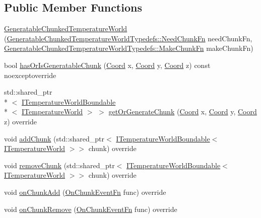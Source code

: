 \subsection*{Public Member Functions}
\begin{DoxyCompactItemize}
\item 
\hyperlink{class_generatable_chunked_temperature_world_ac452b01dbd1b3d78b265007a96b2d1f0}{Generatable\-Chunked\-Temperature\-World} (\hyperlink{namespace_generatable_chunked_temperature_world_typedefs_a07d38658571f8f09839bc1bc8b105107}{Generatable\-Chunked\-Temperature\-World\-Typedefs\-::\-Need\-Chunk\-Fn} need\-Chunk\-Fn, \hyperlink{namespace_generatable_chunked_temperature_world_typedefs_a719e4469a105a21a76ed22274639c03a}{Generatable\-Chunked\-Temperature\-World\-Typedefs\-::\-Make\-Chunk\-Fn} make\-Chunk\-Fn)
\item 
bool \hyperlink{class_generatable_chunked_temperature_world_ad8ebd44d64067e9920d76d46af1b83e2}{has\-Or\-Is\-Generatable\-Chunk} (\hyperlink{struct_coord}{Coord} x, \hyperlink{struct_coord}{Coord} y, \hyperlink{struct_coord}{Coord} z) const noexceptoverride
\item 
std\-::shared\-\_\-ptr\\*
$<$ \hyperlink{class_i_temperature_world_boundable}{I\-Temperature\-World\-Boundable}\\*
$<$ \hyperlink{class_i_temperature_world}{I\-Temperature\-World} $>$ $>$ \hyperlink{class_generatable_chunked_temperature_world_ad5455846504972898e622f9437846f8c}{get\-Or\-Generate\-Chunk} (\hyperlink{struct_coord}{Coord} x, \hyperlink{struct_coord}{Coord} y, \hyperlink{struct_coord}{Coord} z) override
\item 
void \hyperlink{class_generatable_chunked_temperature_world_af1a6752db0e722e8649ddb4c7e1ea8fa}{add\-Chunk} (std\-::shared\-\_\-ptr$<$ \hyperlink{class_i_temperature_world_boundable}{I\-Temperature\-World\-Boundable}$<$ \hyperlink{class_i_temperature_world}{I\-Temperature\-World} $>$$>$ chunk) override
\item 
void \hyperlink{class_generatable_chunked_temperature_world_a42c646343bb79dcdeb9f96e6aa06cbec}{remove\-Chunk} (std\-::shared\-\_\-ptr$<$ \hyperlink{class_i_temperature_world_boundable}{I\-Temperature\-World\-Boundable}$<$ \hyperlink{class_i_temperature_world}{I\-Temperature\-World} $>$$>$ chunk) override
\item 
void \hyperlink{class_generatable_chunked_temperature_world_aa0b55baf21d9605af04d8fef99f9fbd8}{on\-Chunk\-Add} (\hyperlink{class_i_temperature_world_chunkable_observable_mixin_a777c50f4a4ca0b3f7cd6bc02b87bb883}{On\-Chunk\-Event\-Fn} func) override
\item 
void \hyperlink{class_generatable_chunked_temperature_world_a4416f9f9ea400e540b1214b053692760}{on\-Chunk\-Remove} (\hyperlink{class_i_temperature_world_chunkable_observable_mixin_a777c50f4a4ca0b3f7cd6bc02b87bb883}{On\-Chunk\-Event\-Fn} func) override
\end{DoxyCompactItemize}
